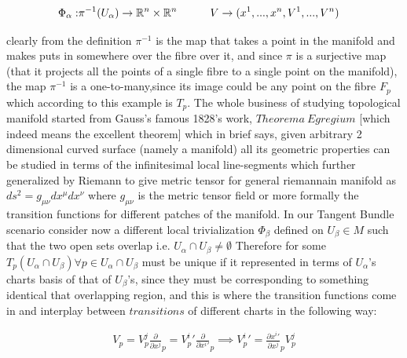 \documentclass[8pt, twocoloumn]{article}
\begin{document}
\begin{align}{\label{localtriv}}
    \Phi_{\alpha}:& \pi^{-1}(U_{\alpha}) \to \mathbb{R}^n \times \mathbb{R}^n \ \ \ \ \ \ \ \ \  V \to (x^1, . . ., x^{n}, V^1, . . ., V^n)
\end{align}

clearly from the definition $\pi^{-1}$ is the map that takes a point in the manifold and makes puts in somewhere over the fibre over it, and since $\pi$ is a surjective map (that it projects all the points of a single fibre to a single point on the manifold), the map $\pi^{-1}$ is a one-to-many,since its image could be any point on the fibre $F_p$ which according to this example is $T_p$.
The whole business of studying topological manifold started from Gauss's famous 1828's work, $Theorema \ Egregium$ [which indeed means the excellent theorem] which in brief says, given arbitrary 2 dimensional curved surface (namely a manifold) all its geometric properties can be studied in terms of the infinitesimal local line-segments which further generalized by Riemann to give metric tensor for general riemannain manifold as $ds^2=g_{\mu \nu}dx^{\mu}dx^{\nu}$ where $g_{\mu \nu}$ is the metric tensor field or more formally the transition functions for different patches of the manifold. In our Tangent Bundle scenario consider now a different local trivialization $\Phi_{\beta}$ defined on $U_{\beta} \in M$  such that the two open sets overlap i.e. $U_{\alpha} \cap U_{\beta} \neq \emptyset$
Therefore for some $T_p(U_{\alpha} \cap U_{\beta}) \forall p \in U_{\alpha} \cap U_{\beta}$ must be unique if it represented in terms of $U_{\alpha}$'s charts basis of that of $U_{\beta}$'s, since they must be corresponding to something identical that overlapping region, and this is where the transition functions come in and interplay between $transitions$ of different charts in the following way: 

\begin{align}
V_p = V_{p}^j \frac{\partial }{\partial x^j}_p =  {V_{p}^i}' \frac{\partial }{\partial {x^i}'}_p \implies  {V_{p}^i}'= \frac{\partial {x^i}'}{\partial x^j }_p V^{j}_p
\end{align}
\end{document}

